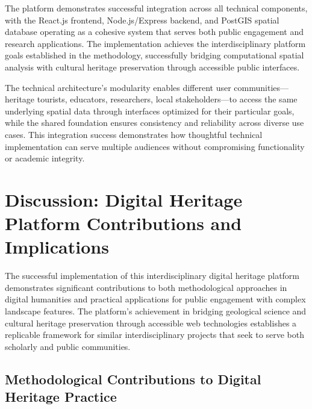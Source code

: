 The platform demonstrates successful integration across all technical components, with the React.js frontend, Node.js/Express backend, and PostGIS spatial database operating as a cohesive system that serves both public engagement and research applications. The implementation achieves the interdisciplinary platform goals established in the methodology, successfully bridging computational spatial analysis with cultural heritage preservation through accessible public interfaces.

The technical architecture's modularity enables different user communities—heritage tourists, educators, researchers, local stakeholders—to access the same underlying spatial data through interfaces optimized for their particular goals, while the shared foundation ensures consistency and reliability across diverse use cases. This integration success demonstrates how thoughtful technical implementation can serve multiple audiences without compromising functionality or academic integrity.


\section{Discussion: Digital Heritage Platform Contributions and Implications}
\label{sec:discussion_implications}

The successful implementation of this interdisciplinary digital heritage platform demonstrates significant contributions to both methodological approaches in digital humanities and practical applications for public engagement with complex landscape features. The platform's achievement in bridging geological science and cultural heritage preservation through accessible web technologies establishes a replicable framework for similar interdisciplinary projects that seek to serve both scholarly and public communities.

\subsection{Methodological Contributions to Digital Heritage Practice}
\label{subsec:methodological_contributions}

